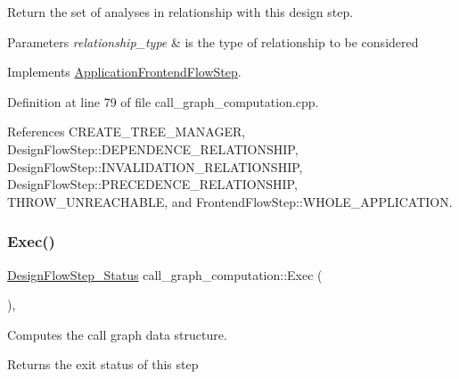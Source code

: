 Return the set of analyses in relationship with this design step. 


\begin{DoxyParams}{Parameters}
{\em relationship\+\_\+type} & is the type of relationship to be considered \\
\hline
\end{DoxyParams}


Implements \hyperlink{classApplicationFrontendFlowStep_ab308200c0096ccff3a1ff50e864ed61f}{Application\+Frontend\+Flow\+Step}.



Definition at line 79 of file call\+\_\+graph\+\_\+computation.\+cpp.



References C\+R\+E\+A\+T\+E\+\_\+\+T\+R\+E\+E\+\_\+\+M\+A\+N\+A\+G\+ER, Design\+Flow\+Step\+::\+D\+E\+P\+E\+N\+D\+E\+N\+C\+E\+\_\+\+R\+E\+L\+A\+T\+I\+O\+N\+S\+H\+IP, Design\+Flow\+Step\+::\+I\+N\+V\+A\+L\+I\+D\+A\+T\+I\+O\+N\+\_\+\+R\+E\+L\+A\+T\+I\+O\+N\+S\+H\+IP, Design\+Flow\+Step\+::\+P\+R\+E\+C\+E\+D\+E\+N\+C\+E\+\_\+\+R\+E\+L\+A\+T\+I\+O\+N\+S\+H\+IP, T\+H\+R\+O\+W\+\_\+\+U\+N\+R\+E\+A\+C\+H\+A\+B\+LE, and Frontend\+Flow\+Step\+::\+W\+H\+O\+L\+E\+\_\+\+A\+P\+P\+L\+I\+C\+A\+T\+I\+ON.

\mbox{\label{classcall__graph__computation_a59dbe3059afb5101f03f746b52e49d0e}} 
\subsubsection{\texorpdfstring{Exec()}{Exec()}}
{\footnotesize\ttfamily \hyperlink{design__flow__step_8hpp_afb1f0d73069c26076b8d31dbc8ebecdf}{Design\+Flow\+Step\+\_\+\+Status} call\+\_\+graph\+\_\+computation\+::\+Exec (\begin{DoxyParamCaption}{ }\end{DoxyParamCaption})\hspace{0.3cm}{\ttfamily [override]}, {\ttfamily [virtual]}}



Computes the call graph data structure. 

\begin{DoxyReturn}{Returns}
the exit status of this step 
\end{DoxyReturn}


